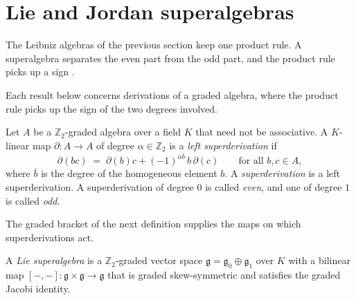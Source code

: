 \section{Lie and Jordan superalgebras}\label{sec:nonassociative:superalgebras}

The Leibniz algebras of the previous section keep one product rule. %
A superalgebra separates the even part from the odd part, and the
product rule picks up a sign \cite[pp.~1--2]{Musson2012}.

Each result below concerns derivations of a graded algebra, where the product rule picks up the sign of the two degrees involved.

\begin{definition}
\label{def:nonassociative:superderivation}
Let $A$ be a $\mathbb{Z}_2$-graded algebra over a field $K$ that need
not be associative. A $K$-linear map $\partial\colon A\to A$ of degree
$\alpha\in\mathbb{Z}_2$ is a \emph{left superderivation} if
\[
\partial(bc)\;=\;\partial(b)c+(-1)^{\alpha\bar{b}}\,b\,\partial(c)
\qquad\text{for all }b,c\in A,
\]
where $\bar b$ is the degree of the homogeneous element $b$. A
\emph{superderivation} is a left superderivation. A superderivation of
degree $0$ is called \emph{even}, and one of degree $1$ is called
\emph{odd}.
\end{definition}

The graded bracket of the next definition supplies the maps on which
superderivations act. %

\begin{definition}
\label{def:nonassociative:lie-super}
A \emph{Lie superalgebra} is a $\mathbb{Z}_2$-graded vector space
$\mathfrak{g}=\mathfrak{g}_0\oplus\mathfrak{g}_1$ over $K$ with a
bilinear map $[-,-]\colon\mathfrak{g}\times\mathfrak{g}\to\mathfrak{g}$
that is graded skew-symmetric and satisfies the graded Jacobi identity.
\end{definition}


